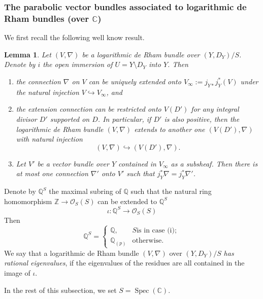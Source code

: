 \documentclass[12pt,twoside]{book}
\theoremstyle{plain}
\newtheorem{lemma}[lemma]{Lemma}
\theoremstyle{definition}
\theoremstyle{remark}
\newcommand{\bC}{{\mathbb C}}
\newcommand{\bQ}{{\mathbb Q}}
\newcommand{\bZ}{{\mathbb Z}}
\newcommand{\mO}{{\mathcal O}}
\DeclareMathOperator\Spec{Spec}
\numberwithin{equation}{section}
\begin{document}
\subsubsection{The parabolic vector bundles associated to logarithmic de Rham bundles (over $\bC$)}

We first recall the following well know result.
\begin{lemma}\label{thm_NatExtLogConn} Let $(V,\nabla)$ be a logarithmic de Rham bundle over $(Y,D_Y)/S$. Denote by $i$ the open immersion of $U=Y\setminus D_Y$ into $Y$. Then
\begin{enumerate}
\item[(1)] the connection $\nabla$ on $V$ can be uniquely extended onto $V_\infty := j_{Y*}j^*_Y(V)$ under the natural injection $V\hookrightarrow V_\infty$, and
\item[(2)] the extension connection can be restricted onto $V(D')$ for any integral divisor $D'$ supported on $D$. In particular, if $D'$ is also positive, then the logarithmic de Rham bundle $(V,\nabla)$ extends to another one $(V(D'),\nabla)$ with natural injection
\[(V,\nabla) \hookrightarrow (V(D'),\nabla).\]
\item[(3)] Let $V'$ be a vector bundle over $Y$ contained in $V_\infty$ as a subsheaf. Then there is at most one connection $\nabla'$ onto $V'$ such that $j_Y^*\nabla = j_Y^*\nabla'$.
\end{enumerate}
\end{lemma}

Denote by $\bQ^S$ the maximal subring of $\bQ$ such that the natural ring homomorphism $\bZ\rightarrow \mO_S(S)$ can be extended to $\bQ^S$
\[ \iota\colon \bQ^S \rightarrow \mO_S(S)\]
Then
\begin{equation*}
\bQ^S = \left\{\begin{array}{ll}
\bQ,& S \text{is in case (i)};\\
\bQ_{(p)} & \text{otherwise.}
\end{array}\right.
\end{equation*}
We say that a logarithmic de Rham bundle $(V,\nabla)$ over $(Y,D_Y)/S$ \emph{has rational eigenvalues}, if the eigenvalues of the residues are all contained in the image of $\iota$.

In the rest of this subsection, we set $S=\Spec(\bC)$.
\end{document}
